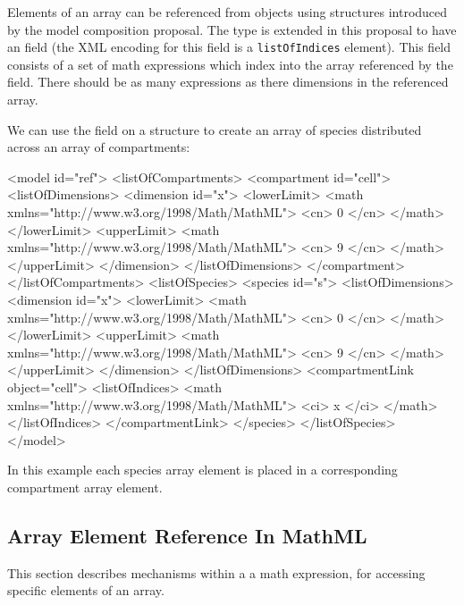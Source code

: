\documentclass{cekarticle}
\begin{document}
Elements of an array can be referenced from objects using  structures introduced by the model composition proposal.
The  type is extended in this proposal to have an  field (the XML encoding for this field is a \texttt{listOfIndices} element).
This field consists of a set of math expressions which index into the array referenced by the  field.  There should be
as many expressions as there dimensions in the referenced array.

We can use the  field on a  structure to create an array of species
distributed across an array of compartments:
\begin{example}
<model id="ref">
    <listOfCompartments>
        <compartment id="cell">
            <listOfDimensions>
                <dimension id="x">
                    <lowerLimit>
                        <math xmlns="http://www.w3.org/1998/Math/MathML">
                            <cn> 0 </cn>
                        </math>
                    </lowerLimit>
                    <upperLimit>
                        <math xmlns="http://www.w3.org/1998/Math/MathML">
                            <cn> 9 </cn>
                        </math>
                    </upperLimit>
                </dimension>
            </listOfDimensions>
        </compartment>
    </listOfCompartments>
    <listOfSpecies>
        <species id="s">
            <listOfDimensions>
                <dimension id="x">
                    <lowerLimit>
                        <math xmlns="http://www.w3.org/1998/Math/MathML">
                            <cn> 0 </cn>
                        </math>
                    </lowerLimit>
                    <upperLimit>
                        <math xmlns="http://www.w3.org/1998/Math/MathML">
                            <cn> 9 </cn>
                        </math>
                    </upperLimit>
                </dimension>
            </listOfDimensions>
            <compartmentLink object="cell">
                <listOfIndices>
                    <math xmlns="http://www.w3.org/1998/Math/MathML">
                        <ci> x </ci>
                    </math>
                </listOfIndices>
            </compartmentLink>
        </species>
    </listOfSpecies>
</model>
\end{example}
In this example each species array element is placed in a
corresponding compartment array element.

\subsection{Array Element Reference In MathML}
This section describes mechanisms within a a math expression, for accessing specific elements of an
array.
\end{document}
